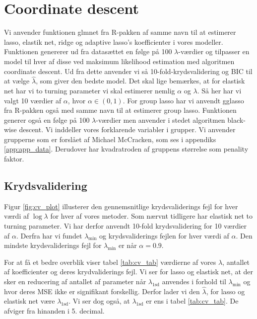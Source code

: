 \section{Coordinate descent}
Vi anvender funktionen glmnet fra R-pakken af samme navn til at estimerer lasso, elastik net, ridge og adaptive lasso's koefficienter i vores modeller. Funktionen genererer ud fra datasættet en følge på 100 $\lambda$-værdier og tilpasser en model til hver af disse ved maksimum likelihood estimation med algoritmen coordinate descent. 
Ud fra dette anvender vi så 10-fold-krydsvalidering og BIC til at vælge $\widehat{\lambda}$, som giver den bedste model. 
Det skal lige bemærkes, at for elastisk net har vi to turning parameter vi skal estimerer nemlig $\alpha$ og $\lambda$.  Så her har vi valgt 10 værdier af  $\alpha$, hvor $\alpha \in (0,1)$. 
For group lasso har vi anvendt gglasso fra R-pakken også med samme navn til at estimerer group lasso. 
Funktionen generer også en følge på 100 $\lambda$-værdier men anvender i stedet algoritmen black-wise descent. 
Vi inddeller vores forklarende variabler i grupper. Vi anvender grupperne som er forslået af Michael McCracken, som ses i appendiks \ref{app:app_data}. Derudover har kvadratroden af gruppens størrelse som penality faktor. 

\subsection{Krydsvalidering}

Figur \ref{fig:cv_plot} illusterer den gennemsnitlige krydsvaliderings fejl for hver værdi af $\log \lambda$ for hver af vores metoder.
Som nærvnt tidligere har elastisk net to turning parameter. Vi har derfor anvendt 10-fold krydsvalidering for 10 værdier af $\alpha$. Derfra har vi fundet  $\lambda_{\min}$ og krydsvaliderings fejlen for hver værdi af $\alpha$.  
Den mindste krydsvaliderings fejl for $\lambda_{\min}$ er når $\alpha =0.9$. 




For at få et bedre overblik viser tabel  \ref{tab:cv_tab} værdierne af vores $\lambda$, antallet af koefficienter og deres krydvaliderings fejl. 
Vi ser for lasso og elastisk net, at der sker en reducering af antallet af parameter når $\lambda_{1\text{sd}}$ anvendes i forhold til $\lambda_{\min}$ og hvor deres MSE ikke er signifikant forskellig.  
Derfor lader vi den $\widehat{\lambda}$, for lasso og elastisk net være $\lambda_{1\text{sd}}$.
Vi ser dog også, at $\lambda_{1\text{sd}}$ er ens i tabel \ref{tab:cv_tab}. 
De afviger fra hinanden i 5. decimal.  

